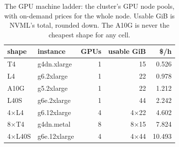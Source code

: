 \begin{table}[tbp]
\centering\small
\caption{The GPU machine ladder: the cluster's GPU node pools, with on-demand  prices for the
whole node. Usable GiB is NVML's total, rounded down. The A10G is never the cheapest shape for any cell.}
\label{tab:ladder}
\begin{tabular}{@{}llrrr@{}}
\toprule
shape & instance & GPUs & usable GiB & \$/h \\
\midrule
T4      & g4dn.xlarge  & 1 & 15         & 0.526 \\
L4      & g6.2xlarge   & 1 & 22         & 0.978 \\
A10G    & g5.2xlarge   & 1 & 22         & 1.212 \\
L40S    & g6e.2xlarge  & 1 & 44         & 2.242 \\
4$\times$L4   & g6.12xlarge  & 4 & 4$\times$22 & 4.602 \\
8$\times$T4   & g4dn.metal   & 8 & 8$\times$15 & 7.824 \\
4$\times$L40S & g6e.12xlarge & 4 & 4$\times$44 & 10.493 \\
\bottomrule
\end{tabular}
\end{table}
